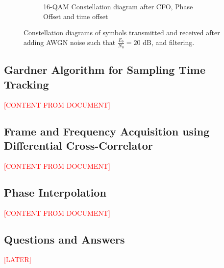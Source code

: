 \begin{figure}[H]
\begin{subfigure}[b]{0.48\textwidth}
		\caption{16-QAM Constellation diagram after CFO, Phase Offset and time offset}
		\label{fig:cfo-po-to-sub}
	\end{subfigure}
	\caption{Constellation diagrams of symbols transmitted and received after adding AWGN noise such that $\frac{E_b}{N_0} = 20$ dB, and filtering.}
	\label{fig:cfo-combined}
\end{figure}


\subsection{Gardner Algorithm for Sampling Time Tracking}
\textcolor{red}{[CONTENT FROM DOCUMENT]}
\subsection{Frame and Frequency Acquisition using Differential Cross-Correlator}
\textcolor{red}{[CONTENT FROM DOCUMENT]}
\subsection{Phase Interpolation}
\textcolor{red}{[CONTENT FROM DOCUMENT]}
\subsection{Questions and Answers}
\textcolor{red}{[LATER]}